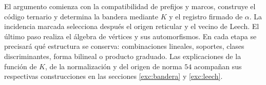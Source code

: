 El argumento comienza con la compatibilidad de prefijos y marcos,
construye el código ternario y determina la bandera mediante \(K\) y el
registro firmado de \(\alpha\). La incidencia marcada selecciona después
el origen reticular y el vecino de Leech. El último paso realiza el álgebra
de vértices y sus automorfismos. En cada etapa se precisará qué estructura
se conserva: combinaciones lineales, soportes, clases discriminantes, forma
bilineal o producto graduado. Las explicaciones de la función de \(K\),
de la normalización y del origen de norma \(54\) acompañan sus respectivas
construcciones en las secciones \ref{exc:bandera} y \ref{exc:leech}.
